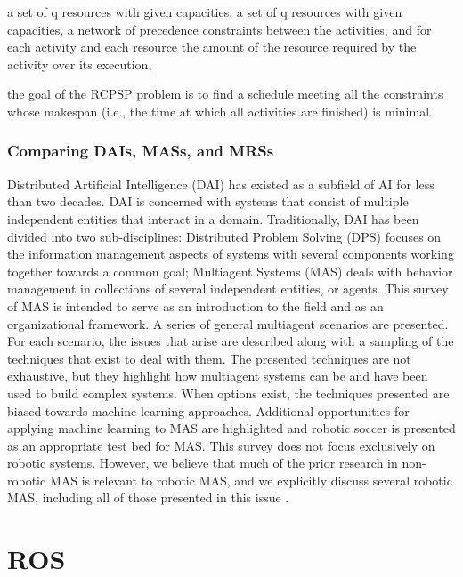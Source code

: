             a set of q resources with given capacities,
            a set of q resources with given capacities,
            a network of precedence constraints between the activities, and
            for each activity and each resource the amount of the resource required by the activity over its execution,
        
        the goal of the RCPSP problem is to find a schedule meeting all the constraints whose makespan (i.e., the time at which all activities are finished) is minimal.
        
        
        \subsection{Comparing DAIs, MASs, and MRSs}
        
        Distributed Artificial Intelligence (DAI) has existed as a subfield of AI for less than two decades. DAI is concerned with systems that consist of multiple independent entities that interact in a domain. Traditionally, DAI has been divided into two sub-disciplines: Distributed Problem Solving (DPS) focuses on the information management aspects of systems with several components working together towards a common goal; Multiagent Systems (MAS) deals with behavior management in collections of several independent entities, or agents. This survey of MAS is intended to serve as an introduction to the field and as an organizational framework. A series of general multiagent scenarios are presented. For each scenario, the issues that arise are described along with a sampling of the techniques that exist to deal with them. The presented techniques are not exhaustive, but they highlight how multiagent systems can be and have been used to build complex systems. When options exist, the techniques presented are biased towards machine learning approaches. Additional opportunities for applying machine learning to MAS are highlighted and robotic soccer is presented as an appropriate test bed for MAS. This survey does not focus exclusively on robotic systems. However, we believe that much of the prior research in non-robotic MAS is relevant to robotic MAS, and we explicitly discuss several robotic MAS, including all of those presented in this issue \cite{ref:stone2000multiagent}.
        
        
        
\chapter[ROS]{ROS} \label{cap:ros}
    
